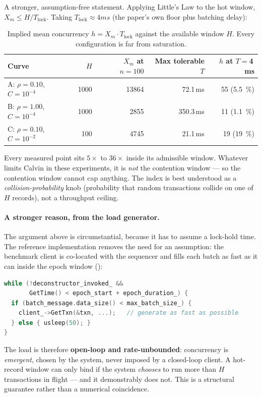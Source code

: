 \documentclass[11pt,a4paper]{article}
\newcommand{\hot}{C}
\newcommand{\pernode}{X_m}
\newcommand{\srcfile}[1]{\texttt{\footnotesize\detokenize{#1}}}
\begin{document}
A stronger, assumption-free statement. Applying Little's Law to the hot window,
$\pernode \le H/T_{\text{lock}}$. Taking $T_{\text{lock}} \approx \si{4} ms$
(the paper's own floor plus batching delay):

\begin{table}[H]
\centering
\caption{Implied mean concurrency $h = \pernode \cdot T_{\text{lock}}$ against
the available window $H$. Every configuration is far from saturation.}
\begin{tabular}{@{}lrrrr@{}}
\toprule
\textbf{Curve} & \textbf{$H$} & \textbf{$\pernode$ at $n{=}100$} &
\textbf{Max tolerable $T$} & \textbf{$h$ at $T{=}$4\,ms} \\
\midrule
A: $\rho{=}0.10$, $\hot{=}10^{-4}$ & \num{1000} & \num{13864} & \num{72.1}\,ms & \num{55}\phantom{0} (\SI{5.5}{\percent}) \\
B: $\rho{=}1.00$, $\hot{=}10^{-4}$ & \num{1000} & \num{2855}  & \num{350.3}\,ms & \num{11}\phantom{0} (\SI{1.1}{\percent}) \\
C: $\rho{=}0.10$, $\hot{=}10^{-2}$ & \num{100}  & \num{4745}  & \num{21.1}\,ms & \num{19}\phantom{0} (\SI{19}{\percent}) \\
\bottomrule
\end{tabular}
\end{table}

Every measured point sits $5\times$ to $36\times$ inside its admissible
window. Whatever limits Calvin in these experiments, it is \emph{not} the
contention window --- so the contention window cannot cap anything. The index
is best understood as a \emph{collision-probability} knob (probability that
random transactions collide on one of $H$ records), not a throughput ceiling.

\paragraph{A stronger reason, from the load generator.} The argument above is
circumstantial, because it has to assume a lock-hold time. The reference
implementation removes the need for an assumption: the benchmark client is
co-located with the sequencer and fills each batch as fast as it can inside the
epoch window (\srcfile{sequencer.cc:119}):
\begin{lstlisting}[language=C]
while (!deconstructor_invoked_ &&
       GetTime() < epoch_start + epoch_duration_) {
  if (batch_message.data_size() < max_batch_size_) {
    client_->GetTxn(&txn, ...);   // generate as fast as possible
  } else { usleep(50); }
}
\end{lstlisting}
The load is therefore \textbf{open-loop and rate-unbounded}: concurrency is
\emph{emergent}, chosen by the system, never imposed by a closed-loop client.
A hot-record window can only bind if the system \emph{chooses} to run more
than $H$ transactions in flight --- and it demonstrably does not. This is a
structural guarantee rather than a numerical coincidence.
\end{document}

